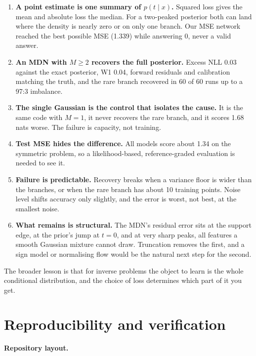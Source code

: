 \documentclass[11pt,a4paper]{article}
\begin{document}
\begin{enumerate}
\item \textbf{A point estimate is one summary of $p(t \mid  x)$.} Squared loss gives the mean and absolute loss the median. For a two-peaked posterior both can land where the density is nearly zero or on only one branch. Our MSE network reached the best possible MSE (1.339) while answering 0, never a valid answer.
\item \textbf{An MDN with $M \ge  2$ recovers the full posterior.} Excess NLL 0.03 against the exact posterior, W1 0.04, forward residuals and calibration matching the truth, and the rare branch recovered in 60 of 60 runs up to a 97:3 imbalance.
\item \textbf{The single Gaussian is the control that isolates the cause.} It is the same code with $M = 1$, it never recovers the rare branch, and it scores 1.68 nats worse. The failure is capacity, not training.
\item \textbf{Test MSE hides the difference.} All models score about 1.34 on the symmetric problem, so a likelihood-based, reference-graded evaluation is needed to see it.
\item \textbf{Failure is predictable.} Recovery breaks when a variance floor is wider than the branches, or when the rare branch has about 10 training points. Noise level shifts accuracy only slightly, and the error is worst, not best, at the smallest noise.
\item \textbf{What remains is structural.} The MDN's residual error sits at the support edge, at the prior's jump at $t = 0$, and at very sharp peaks, all features a smooth Gaussian mixture cannot draw. Truncation removes the first, and a sign model or normalising flow would be the natural next step for the second.
\end{enumerate}

The broader lesson is that for inverse problems the object to learn is the whole conditional distribution, and the choice of loss determines which part of it you get.

\section{Reproducibility and verification}
\textbf{Repository layout.}
\end{document}
